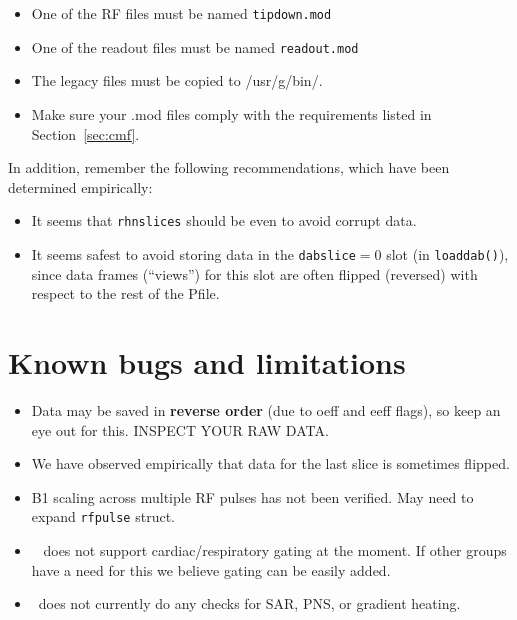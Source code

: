 \begin{itemize}
	\item One of the RF files must be named {\tt tipdown.mod} 
	\item One of the readout files must be named {\tt readout.mod}
	\item The legacy files must be copied to /usr/g/bin/.
	\item Make sure your .mod files comply with the requirements listed in Section~\ref{sec:cmf}.
\end{itemize}

In addition, remember the following recommendations, which have been determined empirically:
\begin{itemize}
	\item It seems that {\tt rhnslices} should be even to avoid corrupt data.
	\item It seems safest to avoid storing data in the {\tt dabslice}$=$0 slot (in \texttt{loaddab()}), since data frames (``views'') for this slot are often flipped (reversed) with respect to the rest of the Pfile.
\end{itemize}


\section{Known bugs and limitations}
\begin{itemize}
	\item Data may be saved in \textbf{reverse order} (due to oeff and eeff flags), so keep an eye out for this. INSPECT YOUR RAW DATA. %
	\item We have observed empirically that data for the last slice is sometimes flipped.
	\item B1 scaling across multiple RF pulses has not been verified. May need to expand \texttt{rfpulse} struct.
	\item \toppe~ does not support cardiac/respiratory gating at the moment. If other groups have a need for this we believe gating can be easily added.
	\item \toppe~does not currently do any checks for SAR, PNS, or gradient heating.
\end{itemize}


